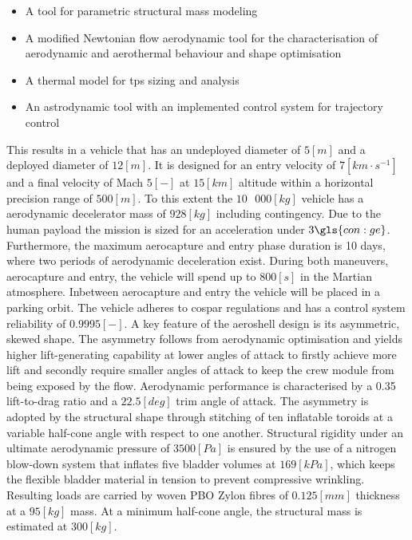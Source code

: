 \begin{itemize}
\item A tool for parametric structural mass modeling
\item A modified Newtonian flow aerodynamic tool for the characterisation of aerodynamic and aerothermal behaviour and shape optimisation
\item A thermal model for \acrfull{tps} sizing and analysis
\item An astrodynamic tool with an implemented control system for trajectory control
\end{itemize}
\vspace{1mm}
This results in a vehicle that has an undeployed diameter of $5 \left[ m \right] $ and a deployed diameter of $12 \left[ m \right]$. It is designed for an entry velocity of $7 \left[ km \cdot s^{-1} \right]$ and a final velocity of Mach $5 \left[-\right]$ at  $15 \left[ km \right] $ altitude within a horizontal precision range of $500 \left[ m \right]$. To this extent the $10\mbox{ }000 \left[ kg \right]$ vehicle has a aerodynamic decelerator mass of $928 \left[ kg \right] $ including contingency. Due to the human payload the mission is sized for an acceleration under $3 \gls{con:ge}$. Furthermore, the maximum aerocapture and entry phase duration is 10 days, where two periods of aerodynamic deceleration exist. During both maneuvers, aerocapture and entry, the vehicle will spend up to $800 \left[ s \right]$ in the Martian atmosphere. Inbetween aerocapture and entry the vehicle will be placed in a parking orbit. The vehicle adheres to \acrshort{cospar} regulations and has a control system reliability of $0.9995 \left[ - \right] $.
\newline
\newline
A key feature of the aeroshell design is its asymmetric, skewed shape. The asymmetry follows from aerodynamic optimisation and yields higher lift-generating capability at lower angles of attack to firstly achieve more lift and secondly require smaller angles of attack to keep the crew module from being exposed by the flow. Aerodynamic performance is characterised by a 0.35 lift-to-drag ratio and a $22.5\left[deg\right]$ trim angle of attack.
\newline
\newline
The asymmetry is adopted by the structural shape through stitching of ten inflatable toroids at a variable half-cone angle with respect to one another. Structural rigidity under an ultimate aerodynamic pressure of $3500 \left[Pa\right]$ is ensured by the use of a nitrogen blow-down system that inflates five bladder volumes at $169 \left[kPa\right]$, which keeps the flexible bladder material in tension to prevent compressive wrinkling. Resulting loads are carried by woven PBO Zylon\textsuperscript{\textregistered} fibres of $0.125 \left[mm\right]$ thickness at a $95 \left[kg\right]$ mass. At a minimum half-cone angle, the structural mass is estimated at $300 \left[kg\right]$. 
